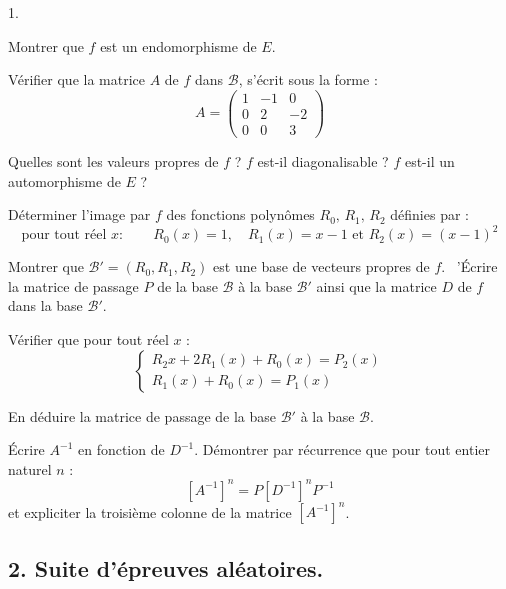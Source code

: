 \documentclass[11pt]{article}%
\begin{document}
\begin{noliste}{1.}
 \setlength{\itemsep}{4mm}
\item Montrer que $f$ est un endomorphisme de $E$.

\item Vérifier que la matrice $A$ de $f$ dans $\mathcal{B}$, s'écrit
sous la
forme : 
\[
A = \left( 
\begin{array}{rrr}
1 & -1 & 0 \\
0 & 2 & -2 \\
0 & 0 & 3
\end{array}
\right)
\]

\item Quelles sont les valeurs propres de $f$ ? $f$ est-il
diagonalisable ? $f$ est-il un automorphisme de $E$ ?

\item Déterminer l'image par $f$ des fonctions polynômes
$R_{0},\,R_{1},\,R_{2}$ définies par : 
\[
\text{pour tout réel }x :\qquad R_{0}\left( x\right) = 1,\quad
R_{1}\left(
x\right) = x-1\text{ et }R_{2}\left( x\right) = \left( x-1\right) ^{2}
\]

\item Montrer que $\mathcal{B}{\prime } = \left(
R_{0},R_{1},R_{2}\right) $
est une base de vecteurs propres de $f$. \ 'Écrire la matrice de
passage $P$ de
la base $\mathcal{B}$ à la base $\mathcal{B}{\prime }$ ainsi que la
matrice 
$D$ de $f$ dans la base $\mathcal{B}{\prime }.$

\item Vérifier que pour tout réel $x$ : 
\[
\left\{ 
\begin{array}{c}
R_{2}x + 2R_{1}\left( x\right) + R_{0}\left( x\right) = P_{2}\left(
x\right) \\
R_{1}\left( x\right) + R_{0}\left( x\right) = P_{1}\left( x\right)
\end{array}
\right.
\]

En déduire la matrice de passage de la base $\mathcal{B}{\prime }$ à la
base $\mathcal{B}$.

\item Écrire $A^{-1}$ en fonction de $D^{-1}.$ Démontrer par récurrence
que pour tout entier naturel $n$ : 
\[
\left[ A^{-1}\right] ^{n} = P\left[ D^{-1}\right] ^{n}P^{-1}
\]
et expliciter la troisième colonne de la matrice $\left[ A^{-1}\right]
^{n}$.
\end{noliste}

\subsection*{2. Suite d'épreuves aléatoires.}
\end{document}
